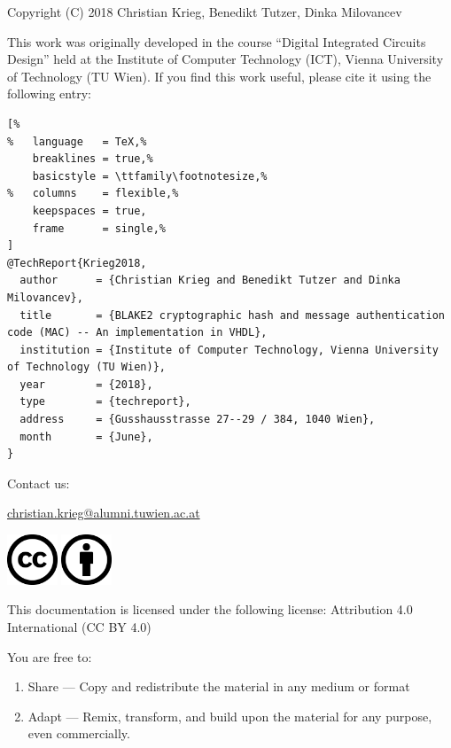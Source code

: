 \documentclass[%
	a4paper,
]
{article}
\begin{document}
%
%

Copyright (C) 2018 Christian Krieg, Benedikt Tutzer, Dinka Milovancev

This work was originally developed in the course ``Digital Integrated
Circuits Design'' held at the Institute of Computer Technology (ICT), Vienna
University of Technology (TU Wien). If you find this work useful, please
cite it using the following \BibTeX{ } entry:

\vspace{1em}

\begin{lstlisting}[%
%	language   = TeX,%
	breaklines = true,%
	basicstyle = \ttfamily\footnotesize,%
%	columns    = flexible,%
	keepspaces = true,
	frame      = single,%
]
@TechReport{Krieg2018,
  author      = {Christian Krieg and Benedikt Tutzer and Dinka Milovancev},
  title       = {BLAKE2 cryptographic hash and message authentication code (MAC) -- An implementation in VHDL},
  institution = {Institute of Computer Technology, Vienna University of Technology (TU Wien)},
  year        = {2018},
  type        = {techreport},
  address     = {Gusshausstrasse 27--29 / 384, 1040 Wien},
  month       = {June},
}
\end{lstlisting}

\vspace{3em}
Contact us:

\href{christian.krieg@alumni.tuwien.ac.at}{christian.krieg@alumni.tuwien.ac.at}

\vfill

\includegraphics[height=1.5cm]{fig/cc-large.png}
\includegraphics[height=1.5cm]{fig/by-large.png}


This documentation is licensed under the following license:
Attribution 4.0 International (CC BY 4.0)

\vspace{3em}

You are free to:

\begin{enumerate}
    \item Share --- Copy and redistribute the material in any medium or format
    \item Adapt --- Remix, transform, and build upon the material for any purpose,
			even commercially.
\end{enumerate}
\end{document}
